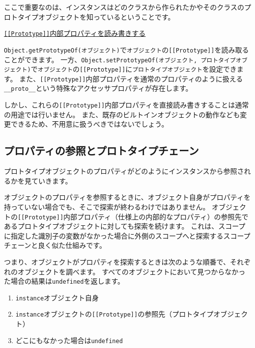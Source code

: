 ここで重要なのは、インスタンスはどのクラスから作られたかやそのクラスのプロトタイプオブジェクトを知っているということです。

\begin{note}{}
\hypertarget{inner-property}{%
\underline{\texttt{{[}{[}Prototype{]}{]}}内部プロパティを読み書きする}\label{inner-property}}

\texttt{Object.getPrototypeOf(オブジェクト)}で\texttt{オブジェクト}の\texttt{[[Prototype]]}を読み取ることができます。
一方、\texttt{Object.setPrototypeOf(オブジェクト, プロトタイプオブジェクト)}で\texttt{オブジェクト}の\texttt{[[Prototype]]}に\texttt{プロトタイプオブジェクト}を設定できます。
また、\texttt{[[Prototype]]}内部プロパティを通常のプロパティのように扱える\texttt{\_\_proto\_\_}という特殊なアクセッサプロパティが存在します。

しかし、これらの\texttt{[[Prototype]]}内部プロパティを直接読み書きすることは通常の用途では行いません。
また、既存のビルトインオブジェクトの動作なども変更できるため、不用意に扱うべきではないでしょう。
\end{note}

\hypertarget{read-prototype-chain}{%
\subsection{プロパティの参照とプロトタイプチェーン}\label{read-prototype-chain}}

プロトタイプオブジェクトのプロパティがどのようにインスタンスから参照されるかを見ていきます。

オブジェクトのプロパティを参照するときに、オブジェクト自身がプロパティを持っていない場合でも、そこで探索が終わるわけではありません。
オブジェクトの\texttt{[[Prototype]]}内部プロパティ（仕様上の内部的なプロパティ）の参照先であるプロトタイプオブジェクトに対しても探索を続けます。
これは、スコープに指定した識別子の変数がなかった場合に外側のスコープへと探索するスコープチェーンと良く似た仕組みです。

つまり、オブジェクトがプロパティを探索するときは次のような順番で、それぞれのオブジェクトを調べます。
すべてのオブジェクトにおいて見つからなかった場合の結果は\texttt{undefined}を返します。

\begin{enumerate}
\def\labelenumi{\arabic{enumi}.}
\item
  \texttt{instance}オブジェクト自身
\item
  \texttt{instance}オブジェクトの\texttt{[[Prototype]]}の参照先（プロトタイプオブジェクト）
\item
  どこにもなかった場合は\texttt{undefined}
\end{enumerate}

